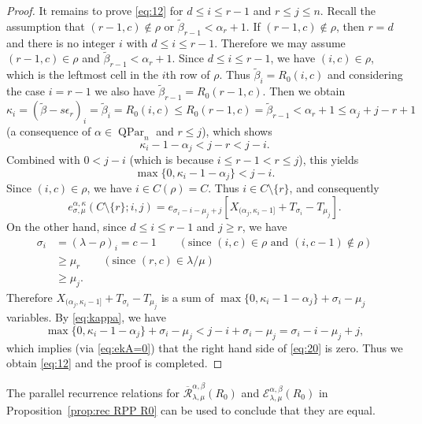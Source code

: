\documentclass[12pt]{amsart}
\numberwithin{equation}{section}
\theoremstyle{definition}
\newcommand\wb{\widetilde{\beta}}
\newcommand\QPar{\operatorname{QPar}}
\newcommand\lm{{\lambda/\mu}}
\newcommand\R{\mathcal{R}}
\newcommand\oR{\overline{\R}}
\newcommand\EE{\mathcal{E}}
\begin{document}
\begin{proof}
  It remains to prove \eqref{eq:12} for $d\le i\le r-1$ and $r\le j\le n$.
  Recall the assumption that $(r-1,c)\notin\rho$ or $\wb_{r-1}<\alpha_r+1$. If
  $(r-1,c)\notin\rho$, then $r=d$ and there is no integer $i$ with $d\le i\le
  r-1$. Therefore we may assume $(r-1,c)\in\rho$ and $\wb_{r-1}<\alpha_r+1$.
  Since $d\le i\le r-1$, we have $(i,c)\in \rho$, which is the leftmost cell in
  the $i$th row of $\rho$. Thus $\wb_{i} = R_0(i,c)$ and considering the case
  $i=r-1$ we also have $\wb_{r-1} = R_0(r-1,c)$. Then we obtain
\[
\kappa_i = (\wb-s\epsilon_r)_i = \wb_i = R_0(i,c) \le R_0(r-1,c) = \wb_{r-1}<
\alpha_r+1 \le \alpha_j+j-r+1
\]
(a consequence of $\alpha \in \QPar_n$ and $r \le j$),
which shows
\[
\kappa_i-1-\alpha_j < j-r <j-i.
\]
Combined with $0<j-i$ (which is because $i\le r-1<r\le j$), this yields
\begin{equation}\label{eq:kappa}
\max\{0,\kappa_i-1-\alpha_j\} <j-i.
\end{equation}
Since $(i, c) \in \rho$, we have $i\in C(\rho)=C$. Thus $i\in
C\setminus\{r\}$, and consequently
  \begin{equation}\label{eq:20}
    e^{\alpha,\kappa}_{\sigma,\mu}(C\setminus\{r\};i,j) =
    e_{\sigma_i-i-\mu_j+j}[X_{(\alpha_j,\kappa_i-1]} + T_{\sigma_i}-T_{\mu_j}].
  \end{equation}
  On the other hand, since $d\le i\le r-1$ and $j\ge r$, we have
\begin{align*}
\sigma_i &= (\lambda-\rho)_i = c-1
\qquad \left(\text{since $(i, c) \in \rho$ and $(i, c-1) \notin \rho$}\right) \\
&\ge \mu_r
\qquad \left(\text{since $(r, c) \in \lm$}\right) \\
&\ge \mu_j.
\end{align*}
Therefore
$X_{(\alpha_j,\kappa_i-1]} + T_{\sigma_i}-T_{\mu_j}$
is a sum of $\max\{0,\kappa_i-1-\alpha_j\}+\sigma_i-\mu_j$ variables.
By \eqref{eq:kappa}, we have
\[
  \max\{0,\kappa_i-1-\alpha_j\}+\sigma_i-\mu_j < j-i +\sigma_i-\mu_j
  = \sigma_i-i-\mu_j+j,
\]
which implies (via \eqref{eq:ekA=0})
that the right hand side of \eqref{eq:20} is zero.
Thus we obtain \eqref{eq:12} and the proof is completed.
\end{proof}



The parallel recurrence relations for $\oR^{\alpha,\beta}_{\lambda,\mu}(R_0)$ and
$\EE^{\alpha,\beta}_{\lambda,\mu}(R_0)$ in Proposition~\ref{prop:rec RPP R0} can
be used to conclude that they are equal.
\end{document}
